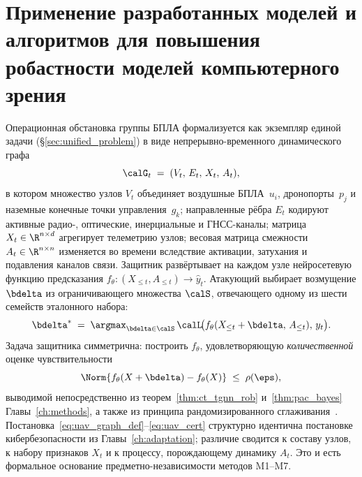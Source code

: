 \section{Применение разработанных моделей и алгоритмов для повышения робастности моделей компьютерного зрения}
\label{sec:uav_graph}
Операционная обстановка группы БПЛА формализуется как экземпляр
единой задачи (\S\ref{sec:unified_problem})
в виде непрерывно-временного динамического графа
\begin{equation}
\calG_t \;=\; (V_t,\,E_t,\,X_t,\,A_t),
\label{eq:uav_graph_def}
\end{equation}
в котором множество узлов $V_t$ объединяет воздушные БПЛА~$u_i$,
дронопорты~$p_j$ и наземные конечные точки управления~$g_k$; направленные
рёбра $E_t$ кодируют активные радио-, оптические, инерциальные и
ГНСС-каналы; матрица $X_t \in \R^{n\times d}$ агрегирует телеметрию узлов;
весовая матрица смежности $A_t \in \R^{n\times n}$ изменяется во времени
вследствие активации, затухания и подавления каналов связи.
Защитник развёртывает на каждом узле нейросетевую функцию предсказания
$f_{\theta}\colon (X_{\le t},A_{\le t}) \to \hat{y}_t$. Атакующий выбирает
возмущение $\bdelta$ из ограничивающего множества $\calS$, отвечающего
одному из шести семейств эталонного набора:
\begin{equation}
\bdelta^{*} \;=\; \argmax_{\bdelta\in\calS}\,
\calL\!\bigl(f_{\theta}(X_{\le t}+\bdelta,\,A_{\le t}),\,y_t\bigr).
\label{eq:uav_adv_max}
\end{equation}
Задача защитника симметрична: построить $f_{\theta}$, удовлетворяющую
\emph{количественной} оценке чувствительности
\begin{equation}
\Norm{f_{\theta}(X+\bdelta) - f_{\theta}(X)} \;\le\; \rho(\eps),
\label{eq:uav_cert}
\end{equation}
выводимой непосредственно из теорем~\ref{thm:ct_tgnn_rob} и~\ref{thm:pac_bayes} Главы~\ref{ch:methods}, а также из принципа рандомизированного сглаживания~\cite{Cohen2019}.
Постановка~\eqref{eq:uav_graph_def}--\eqref{eq:uav_cert} структурно
идентична постановке кибербезопасности из Главы~\ref{ch:adaptation}; различие
сводится к составу узлов, к набору признаков $X_t$ и к процессу,
порождающему динамику $A_t$. Это и есть формальное основание
предметно-независимости методов \textsf{M1}--\textsf{M7}.
